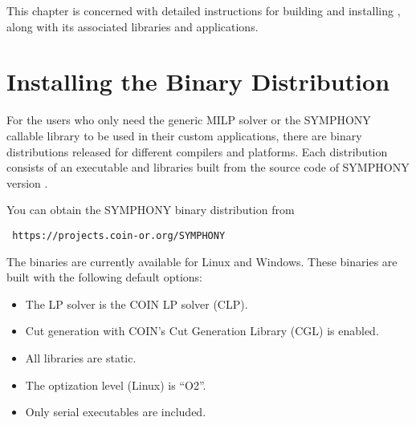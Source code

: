 
This chapter is concerned with detailed instructions for building and
installing \BB, along with its associated libraries and applications.

\section{Installing the Binary Distribution}

For the users who only need the generic MILP solver or the SYMPHONY 
callable library to be used in their custom applications, there are 
binary distributions released for different compilers and platforms. 
Each distribution consists of an executable and libraries built from the 
source code of SYMPHONY version \VER.
 
You can obtain the SYMPHONY binary distribution from 
{\color{Brown}
\begin{verbatim}
 https://projects.coin-or.org/SYMPHONY
\end{verbatim}
}

The binaries are currently available for Linux and Windows. These binaries are
built with the following default options:
\begin{itemize}
\item The LP solver is the COIN LP solver (CLP).
\item Cut generation with COIN's Cut Generation Library (CGL) is enabled.
\item All libraries are static.
\item The optization level (Linux) is ``O2''. 
\item Only serial executables are included.
\end{itemize} 

